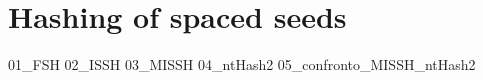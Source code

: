 \chapter{Hashing of spaced seeds}
\label{chp:hashing}

{01_FSH}
{02_ISSH}
{03_MISSH}
{04_ntHash2}
{05_confronto_MISSH_ntHash2}

